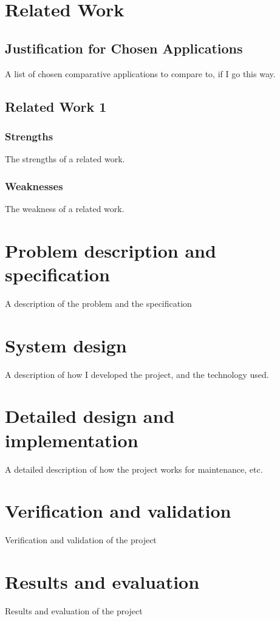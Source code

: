\documentclass{article}
\begin{document}
\section{Related Work}
\subsection{Justification for Chosen Applications}
A list of chosen comparative applications to compare to, if I go this way.

\subsection{Related Work 1}
\subsubsection{Strengths}
The strengths of a related work.

\subsubsection{Weaknesses}
The weakness of a related work.

\section{Problem description and specification}
A description of the problem and the specification

\section{System design}
A description of how I developed the project, and the technology used.

\section{Detailed design and implementation}
A detailed description of how the project works for maintenance, etc.

\section{Verification and validation}
Verification and validation of the project

\section{Results and evaluation}
Results and evaluation of the project
\end{document}
